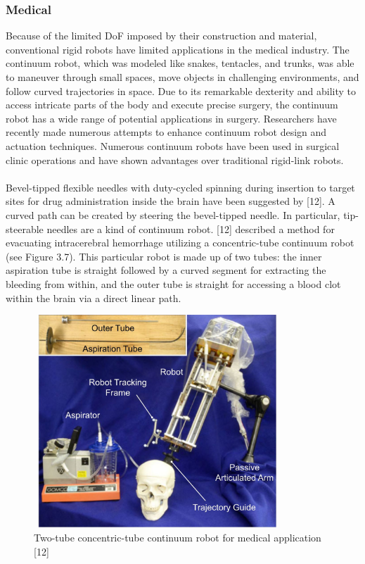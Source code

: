 \documentclass[12pt,twoside,a4]{mwbk}
\begin{document}
\subsubsection{Medical}
Because of the limited DoF imposed by their construction and material, conventional rigid robots have limited applications in the medical industry. The continuum robot, which was modeled like snakes, tentacles, and trunks, was able to maneuver through small spaces, move objects in challenging environments, and follow curved trajectories in space. Due to its remarkable dexterity and ability to access intricate parts of the body and execute precise surgery, the continuum robot has a wide range of potential applications in surgery. Researchers have recently made numerous attempts to enhance continuum robot design and actuation techniques. Numerous continuum robots have been used in surgical clinic operations and have shown advantages over traditional rigid-link robots.
\\ \\
Bevel-tipped flexible needles with duty-cycled spinning during insertion to target sites for drug administration inside the brain have been suggested by [12]. A curved path can be created by steering the bevel-tipped needle. In particular, tip-steerable needles are a kind of continuum robot. [12] described a method for evacuating intracerebral hemorrhage utilizing a concentric-tube continuum robot (see Figure 3.7). This particular robot is made up of two tubes: the inner aspiration tube is straight followed by a curved segment for extracting the bleeding from within, and the outer tube is straight for accessing a blood clot within the brain via a direct linear path.
\begin{figure}[h]
    \centering
    \includegraphics[width=9.3cm, height=8.0cm]{medic1.JPG}
    \caption{Two-tube concentric-tube continuum robot for medical application [12]}
\end{figure}
\end{document}
